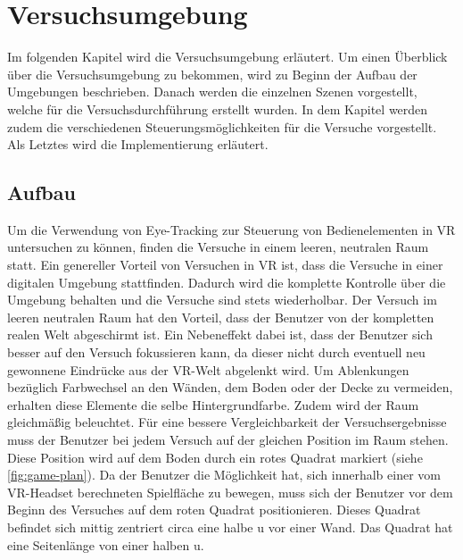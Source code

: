 
\chapter{Versuchsumgebung}
\label{section:versuchsumgebung}
Im folgenden Kapitel wird die Versuchsumgebung erläutert. Um einen Überblick über die Versuchsumgebung zu bekommen, wird zu Beginn der Aufbau der Umgebungen beschrieben. Danach werden die einzelnen Szenen vorgestellt, welche für die Versuchsdurchführung erstellt wurden. In dem Kapitel werden zudem die verschiedenen Steuerungsmöglichkeiten für die Versuche vorgestellt. Als Letztes wird die Implementierung erläutert. 

\section{Aufbau}
Um die Verwendung von Eye-Tracking zur Steuerung von Bedienelementen in \ac{VR} untersuchen zu können, finden die Versuche in einem leeren, neutralen Raum statt. Ein genereller Vorteil von Versuchen in \ac{VR} ist, dass die Versuche in einer digitalen Umgebung stattfinden. Dadurch wird die komplette Kontrolle über die Umgebung behalten und die Versuche sind stets wiederholbar. Der Versuch im leeren neutralen Raum hat den Vorteil, dass der Benutzer von der kompletten realen Welt abgeschirmt ist. Ein Nebeneffekt dabei ist, dass der Benutzer sich besser auf den Versuch fokussieren kann, da dieser nicht durch eventuell neu gewonnene Eindrücke aus der \ac{VR}-Welt abgelenkt wird. Um Ablenkungen bezüglich Farbwechsel an den Wänden, dem Boden oder der Decke zu vermeiden, erhalten diese Elemente die selbe Hintergrundfarbe. Zudem wird der Raum gleichmäßig beleuchtet. Für eine bessere Vergleichbarkeit der Versuchsergebnisse muss der Benutzer bei jedem Versuch auf der gleichen Position im Raum stehen. Diese Position wird auf dem Boden durch ein rotes Quadrat markiert (siehe \autoref{fig:game-plan}). Da der Benutzer die Möglichkeit hat, sich innerhalb einer vom \ac{VR}-Headset berechneten Spielfläche zu bewegen, muss sich der Benutzer vor dem Beginn des Versuches auf dem roten Quadrat positionieren. Dieses Quadrat befindet sich mittig zentriert circa eine halbe \acl{u} vor einer Wand. Das Quadrat hat eine Seitenlänge von einer halben \acl{u}.

